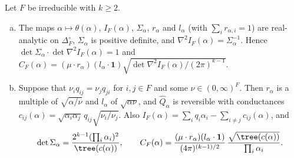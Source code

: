 \begin{proposition}\label{prop:constant}
Let $F$ be irreducible with $k\ge2$.
\begin{enumerate}[(a)]
\item The maps $\alpha\mapsto\theta(\alpha)$, $I_F(\alpha)$, $\Sigma_\alpha$,
$r_\alpha$ and $l_\alpha$ (with $\sum_ir_{\alpha,i}=1$) are real-analytic on
$\Delta_F^\circ$, $\Sigma_\alpha$ is positive definite, and
$\nabla^2I_F(\alpha)=\Sigma_\alpha^{-1}$. Hence
$\det\Sigma_\alpha\cdot\det\nabla^2I_F(\alpha)=1$ and
$C_F(\alpha)=(\mu\cdot r_\alpha)(l_\alpha\cdot\mathbf 1)
\sqrt{\det\nabla^2I_F(\alpha)/(2\pi)^{k-1}}$.
\item Suppose that $\nu_iq_{ij}=\nu_jq_{ji}$ for $i,j\in F$ and some
$\nu\in(0,\infty)^F$. Then $r_\alpha$ is a multiple of $\sqrt{\alpha/\nu}$
and $l_\alpha$ of $\sqrt{\alpha\nu}$, and $\widehat Q_\alpha$ is reversible
with conductances $c_{ij}(\alpha)=\sqrt{\alpha_i\alpha_j}\,q_{ij}\sqrt{\nu_i/\nu_j}$.
Also $I_F(\alpha)=\sum_iq_i\alpha_i-\sum_{i\ne j}c_{ij}(\alpha)$, and
\[
\det\Sigma_\alpha=\frac{2^{k-1}(\prod_i\alpha_i)^2}{\tree(c(\alpha))},\qquad
C_F(\alpha)=\frac{(\mu\cdot r_\alpha)(l_\alpha\cdot\mathbf 1)}{(4\pi)^{(k-1)/2}}
\,\frac{\sqrt{\tree(c(\alpha))}}{\prod_i\alpha_i}.
\]
\end{enumerate}
\end{proposition}

